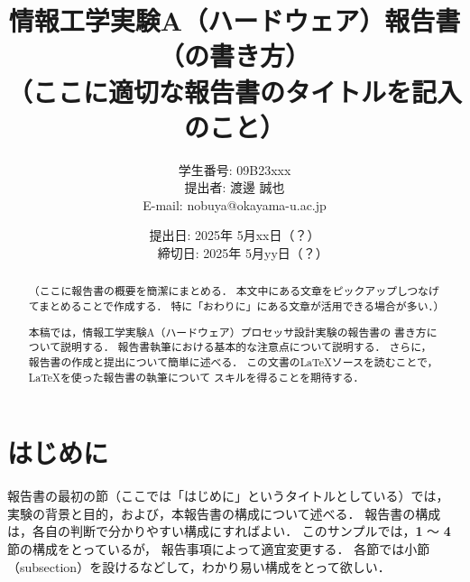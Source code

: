 \documentclass{jarticle}[11pt]
\title{{\normalsize 情報工学実験A（ハードウェア）報告書（の書き方）}\\
    （ここに適切な報告書のタイトルを記入のこと）
    }
\author{ 
      学生番号: 09B23xxx \\
      提出者: 渡邊 誠也 \\
      E-mail: nobuya@okayama-u.ac.jp
    }
\date{
    提出日: 2025年 5月xx日（？）\\　%
    締切日: 2025年 5月yy日（？）    %
    }
\begin{document}
    \maketitle
     
     
    \begin{abstract}
    （ここに報告書の概要を簡潔にまとめる．
    本文中にある文章をピックアップしつなげてまとめることで作成する．
    特に「おわりに」にある文章が活用できる場合が多い．）
     
    本稿では，情報工学実験A（ハードウェア）プロセッサ設計実験の報告書の
    書き方について説明する．
    報告書執筆における基本的な注意点について説明する．
    さらに，報告書の作成と提出について簡単に述べる．
    この文書の\LaTeX ソースを読むことで，\LaTeX を使った報告書の執筆について
    スキルを得ることを期待する．
    \end{abstract}
     
     
    \section{はじめに}
     
    報告書の最初の節（ここでは「{\gt はじめに}」というタイトルとしている）では，
    実験の背景と目的，および，本報告書の構成について述べる．
    報告書の構成は，各自の判断で分かりやすい構成にすればよい．
    このサンプルでは，{\bf 1} 〜 {\bf 4} 節の構成をとっているが，
    報告事項によって適宜変更する．
    各節では小節（subsection）を設けるなどして，わかり易い構成をとって欲しい．
     
\end{document}
